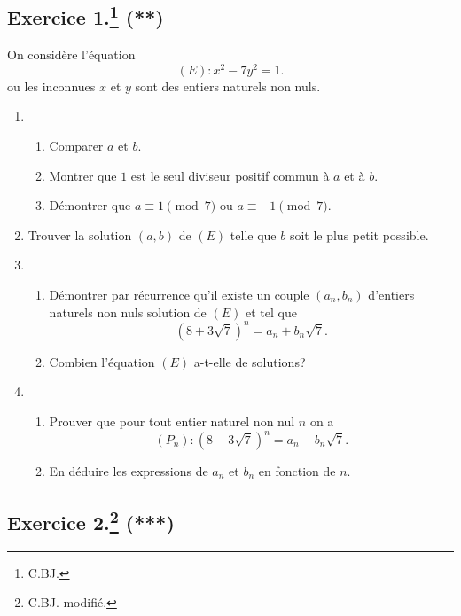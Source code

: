 \documentclass[a4paper]{article}
\begin{document}
\subsection*{Exercice 1.\footnote{C.BJ.} (**)}
On considère l'équation \[
	(E):x^2-7y^2=1
.\] ou les inconnues $x$ et $y$ sont des entiers naturels non nuls.
\begin{enumerate}
	\item \begin{enumerate}[label=(\alph*)]
		\item Comparer $a$ et $b$.\\
		\item Montrer que $1$ est le seul diviseur positif commun à $a$ et à $b$.\\
		\item Démontrer que $a\equiv 1\pmod{7}$ ou $a\equiv -1 \pmod{7}$.
	\end{enumerate}
\item Trouver la solution $(a,b)$ de $(E)$ telle que $b$ soit le plus petit possible.
\item 	\begin{enumerate}[label=(\alph*)]
	\item Démontrer par récurrence qu'il existe un couple $(a_n,b_n)$ d'entiers naturels non nuls solution de $(E)$ et tel que \[
			(8+3\sqrt{7})^n=a_n+b_n\sqrt{7}	.\]
		\item Combien l'équation $(E)$ a-t-elle de solutions?
	\end{enumerate}	
\item 	\begin{enumerate}[label=(\alph*)]
	\item Prouver que pour tout entier naturel non nul $n$ on a \[
			(P_n):(8-3\sqrt{7})^n=a_n-b_n\sqrt{7}.\] 		
	\item En déduire les expressions de $a_n$ et $b_n$ en fonction de $n$.
	\end{enumerate}
\end{enumerate}



\subsection*{Exercice 2.\footnote{C.BJ. modifié.} (***)}
\end{document}
